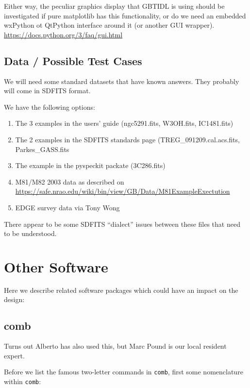 \documentclass[12pt,a4paper]{article}
\begin{document}
Either way, the peculiar graphics display that GBTIDL is using should
be investigated if pure matplotlib has this functionality, or do we
need an embedded wxPython ot QtPython interface around it (or another
GUI wrapper).  \url{https://docs.python.org/3/faq/gui.html}


\subsection{Data / Possible Test Cases}

We will need some standard datasets that have known answers. They probably will come in SDFITS format.

We have the following options:

\begin{enumerate}

\item
  The 3 examples in the users' guide (ngc5291.fits, W3OH.fits, IC1481.fits)
\item
  The 2 examples in the SDFITS standards page (TREG\_091209.cal.acs.fits, Parkes\_GASS.fits
\item
  The example in the pyspeckit packate (3C286.fits)
\item
  M81/M82 2003 data as described on\newline
  \url{https://safe.nrao.edu/wiki/bin/view/GB/Data/M81ExampleExectution}
\item
  EDGE survey data via Tony Wong
\end{enumerate}

There appear to be some SDFITS ``dialect'' issues between these files that need to be understood.

\section{Other Software}

Here we describe related software packages which could have an impact on the design:

\subsection{comb}

Turns out Alberto has also used this, but Marc Pound is our local resident expert.

Before we list the famous two-letter commands in {\tt comb}, first some nomenclature within {\tt comb}:
\end{document}
